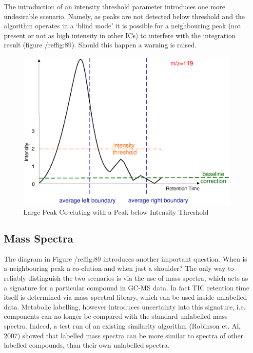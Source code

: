 The introduction of an intensity threshold parameter introduces one more 
undesirable scenario. Namely, as peaks are not detected below threshold and the 
algorithm operates in a ‘blind mode’ it is possible for a neighbouring peak 
(not present or not as high intensity in other ICs) to interfere with the 
integration result (figure /ref{fig:89}). Should this happen a warning is raised.

\begin{figure}
  \begin{center}
    \includegraphics[scale=1]{graphics/chapter08/89.eps}
  \end{center}
  \caption{Large Peak Co-eluting with a Peak below Intensity Threshold}
  \label{fig:89}
\end{figure}

\subsection
{Mass Spectra}

The diagram in Figure /ref{fig:89} introduces another important question. 
When is a neighbouring peak a co-elution and when just a shoulder? The only way 
to reliably distinguish the two scenarios is via the use of mass spectra, which 
acts as a signature for a particular compound in GC-MS data. In fact TIC 
retention time itself is determined via mass spectral library, which can be 
used inside unlabelled data. Metabolic labelling, however introduces uncertainty 
into this signature, i.e. components can no longer be compared with the standard 
unlabelled mass spectra. Indeed, a test run of an existing similarity algorithm 
(Robinson et. Al, 2007) showed that labelled mass spectra can be more similar 
to spectra of other labelled compounds, than their own unlabelled spectra.

